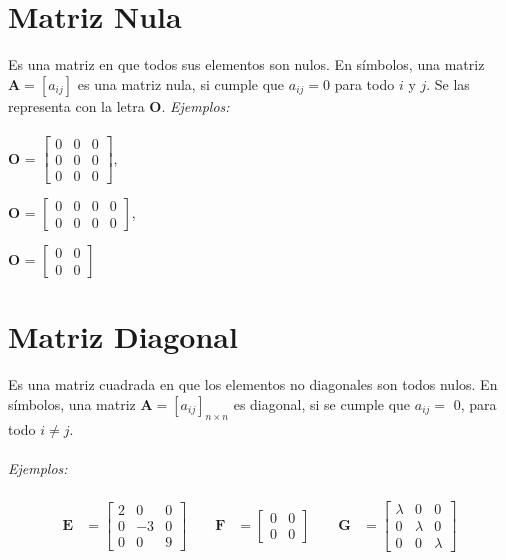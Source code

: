 \documentclass[a4paper,12pt]{report} %
\begin{document}
\section{Matriz Nula}
Es una matriz en que todos sus elementos son nulos. En símbolos, una matriz \(\mathbf{A} = \left[ a_{ij} \right]\) es una matriz nula, si cumple que \(a_{ij} = 0\) para todo \(i\) y \(j\).  
Se las representa con la letra \(\mathbf{O}\).
\newpage
\textit{Ejemplos:} \\ \\
\textbf{O} =
$\begin{bmatrix}
0 & 0 & 0 \\
0 & 0 & 0 \\
0 & 0 & 0
\end{bmatrix}$,\\
\vspace{0.5cm}

\textbf{O} =
$\begin{bmatrix}
0 & 0 & 0 & 0\\
0 & 0 & 0 & 0
\end{bmatrix}$,\\
\vspace{0.5cm}

\textbf{O} =
$\begin{bmatrix}
0 & 0 \\
0 & 0
\end{bmatrix}$\\

\section{Matriz Diagonal}

Es una matriz cuadrada en que los elementos no diagonales son todos nulos. En símbolos, una matriz \(\mathbf{A} = \left[ a_{ij} \right]_\mathit{n\times n}\) es diagonal, si se cumple que \(\mathit{a_{ij}=}\) 0, para todo \(\mathit{i\neq j}\).\\ \\
\textit{Ejemplos:}\\ \\  
\[
\begin{aligned}
\mathbf{E} &= \begin{bmatrix}
    2 & 0 & 0 \\
    0 & -3 & 0 \\
    0 & 0 & 9
\end{bmatrix}
\qquad
\mathbf{F} &= \begin{bmatrix}
    0 & 0 \\
    0 & 0
\end{bmatrix}
\qquad
\mathbf{G} &= \begin{bmatrix}
    \lambda  & 0 & 0 \\
    0 & \lambda & 0 \\
    0 & 0 & \lambda
\end{bmatrix}
\end{aligned}
\]
\\
\end{document}
